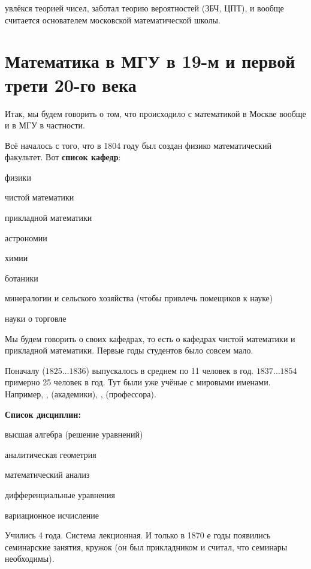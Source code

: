 \documentclass[a4paper,oneside,fleqn,10pt]{article}
\newcommand{\pe}[2]{${#1}\ldots{#2}$}
\begin{document}
 увлёкся теорией чисел, заботал теорию вероятностей
(ЗБЧ, ЦПТ), и вообще считается основателем московской математической
школы.


\section{Математика в МГУ в 19-м и первой трети 20-го века}

Итак, мы будем говорить о том, что происходило с математикой в Москве
вообще и в МГУ в частности.

Всё началось с того, что в 1804 году был создан физико математический
факультет.  Вот \textbf{список кафедр}:
\begin{nums}{-2}
\item физики
\item чистой математики
\item прикладной математики
\item астрономии
\item химии
\item ботаники
\item минералогии и сельского хозяйства (чтобы привлечь помещиков к
  науке)
\item науки о торговле
\end{nums}

Мы будем говорить о своих кафедрах, то есть о кафедрах чистой
математики и прикладной математики. Первые годы студентов было совсем
мало.

Поначалу (\pe{1825}{1836}) выпускалось в среднем по 11 человек в год.
\pe{1837}{1854} примерно 25 человек в год. Тут были уже учёные с
мировыми именами. Например, ,  (академики),
,  (профессора).

\textbf{Список дисциплин:}

\begin{nums}{-2}
\item высшая алгебра (решение уравнений)
\item аналитическая геометрия
\item математический анализ
\item дифференциальные уравнения
\item вариационное исчисление
\end{nums}

Учились 4 года. Система лекционная. И только в 1870 е годы появились
семинарские занятия, кружок  (он был
прикладником и считал, что семинары необходимы).
\end{document}
